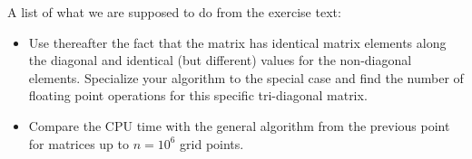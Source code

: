 
A list of what we are supposed to do from the exercise text:

\begin{itemize}

\item Use thereafter the fact that the matrix has identical matrix elements along the diagonal and identical (but different) values for the non-diagonal elements. Specialize your algorithm to the special case and find the number of floating point operations for this specific tri-diagonal matrix. 

\item Compare the CPU time with the general algorithm from the previous point for matrices up to  $n=10^6$ grid points. 

\end{itemize}


